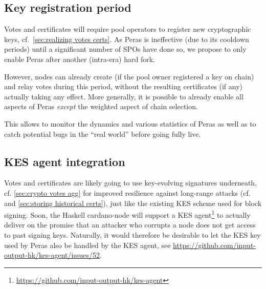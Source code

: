 \subsection{Key registration period}

Votes and certificates will require pool operators to register new cryptographic keys, cf.\ \cref{sec:realizing votes certs}.
As Peras is ineffective (due to its cooldown periods) until a significant number of SPOs have done so, we propose to only enable Peras after another (intra-era) hard fork.

However, nodes can already create (if the pool owner registered a key on chain) and relay votes during this period, without the resulting certificates (if any) actually taking any effect.
More generally, it is possible to already enable all aspects of Peras \emph{except} the weighted aspect of chain selection.

This allows to monitor the dynamics and various statistics of Peras as well as to catch potential bugs in the \enquote{real world} before going fully live.

\subsection{KES agent integration}

Votes and certificates are likely going to use key-evolving signatures underneath, cf. \cref{sec:crypto votes agg} for improved resilience against long-range attacks (cf.\ \cite{david2018ouroboros} and \cref{sec:storing historical certs}), just like the existing KES scheme used for block signing.
Soon, the Haskell cardano-node will support a KES agent\footnote{\url{https://github.com/input-output-hk/kes-agent}} to actually deliver on the promise that an attacker who corrupts a node does not get access to past signing keys.
Naturally, it would therefore be desirable to let the KES key used by Peras also be handled by the KES agent, see \url{https://github.com/input-output-hk/kes-agent/issues/52}.

